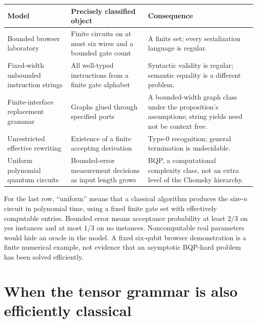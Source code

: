\begin{center}\small
\begin{tabular}{p{.25\linewidth}p{.32\linewidth}p{.34\linewidth}}
\toprule
Model & Precisely classified object & Consequence\\\midrule
Bounded browser laboratory & Finite circuits on at most six wires and a bounded gate count & A finite set; every serialization language is regular.\\
Fixed-width unbounded instruction strings & All well-typed instructions from a finite gate alphabet & Syntactic validity is regular; semantic equality is a different problem.\\
Finite-interface replacement grammar & Graphs glued through specified ports & A bounded-width graph class under the proposition's assumptions; string yields need not be context free.\\
Unrestricted effective rewriting & Existence of a finite accepting derivation & Type-0 recognition; general termination is undecidable.\\
Uniform polynomial quantum circuits & Bounded-error measurement decisions as input length grows & BQP, a computational complexity class, not an extra level of the Chomsky hierarchy.\\\bottomrule
\end{tabular}
\end{center}

For the last row, ``uniform'' means that a classical algorithm produces the size-$n$ circuit in polynomial time, using a fixed finite gate set with effectively computable entries. Bounded error means acceptance probability at least $2/3$ on yes instances and at most $1/3$ on no instances. Noncomputable real parameters would hide an oracle in the model. A fixed six-qubit browser demonstration is a finite numerical example, not evidence that an asymptotic BQP-hard problem has been solved efficiently.

\section{When the tensor grammar is also efficiently classical}

